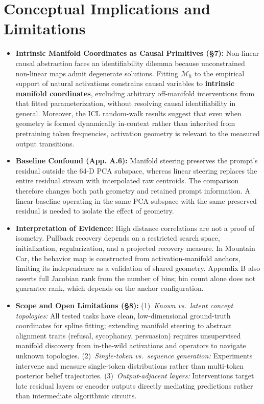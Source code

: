 \documentclass[10pt,a4paper]{article}
\newcommand{\Mh}{\mathcal{M}_h}
\begin{document}
\section{Conceptual Implications and Limitations}

\begin{itemize}[leftmargin=*,nosep]
    \item \textbf{Intrinsic Manifold Coordinates as Causal Primitives (\S7):} Non-linear causal abstraction faces an identifiability dilemma because unconstrained non-linear maps admit degenerate solutions. Fitting $\Mh$ to the empirical support of natural activations constrains causal variables to \textbf{intrinsic manifold coordinates}, excluding arbitrary off-manifold interventions from that fitted parameterization, without resolving causal identifiability in general. Moreover, the ICL random-walk results suggest that even when geometry is formed dynamically in-context rather than inherited from pretraining token frequencies, activation geometry is relevant to the measured output transitions.
    \item \textbf{Baseline Confound (App. A.6):} Manifold steering preserves the prompt's residual outside the 64-D PCA subspace, whereas linear steering replaces the entire residual stream with interpolated raw centroids. The comparison therefore changes both path geometry and retained prompt information. A linear baseline operating in the same PCA subspace with the same preserved residual is needed to isolate the effect of geometry.
    \item \textbf{Interpretation of Evidence:} High distance correlations are not a proof of isometry. Pullback recovery depends on a restricted search space, initialization, regularization, and a projected recovery measure. In Mountain Car, the behavior map is constructed from activation-manifold anchors, limiting its independence as a validation of shared geometry. Appendix B also asserts full Jacobian rank from the number of bins; bin count alone does not guarantee rank, which depends on the anchor configuration.
    \item \textbf{Scope and Open Limitations (\S8):} (1)~\emph{Known vs.\ latent concept topologies:} All tested tasks have clean, low-dimensional ground-truth coordinates for spline fitting; extending manifold steering to abstract alignment traits (refusal, sycophancy, persuasion) requires unsupervised manifold discovery from in-the-wild activations and operators to navigate unknown topologies. (2)~\emph{Single-token vs.\ sequence generation:} Experiments intervene and measure single-token distributions rather than multi-token posterior belief trajectories. (3)~\emph{Output-adjacent layers:} Interventions target late residual layers or encoder outputs directly mediating predictions rather than intermediate algorithmic circuits.
\end{itemize}
\end{document}
